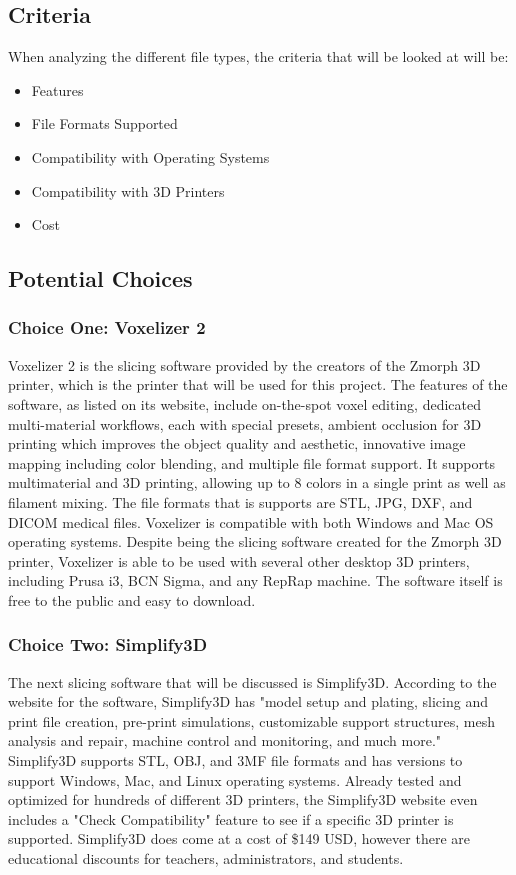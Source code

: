 \documentclass[letterpaper, onecolumn, draftclsnofoot,10pt, compsoc]{IEEEtran}
\begin{document}
\begin{singlespace}
\subsection{Criteria}
When analyzing the different file types, the criteria that will be looked at will be: \begin{itemize}
\item Features
\item File Formats Supported
\item Compatibility with Operating Systems
\item Compatibility with 3D Printers
\item Cost

\end{itemize}
\subsection{Potential Choices}
\subsubsection{Choice One: Voxelizer 2}
Voxelizer 2 is the slicing software provided by the creators of the Zmorph 3D printer, which is the printer that will be used for this project. 
The features of the software, as listed on its website, include on-the-spot voxel editing, dedicated multi-material workflows, each with special presets, ambient occlusion for 3D printing which improves the object quality and aesthetic, innovative image mapping including color blending, and multiple file format support. 
It supports multimaterial and 3D printing, allowing up to 8 colors in a single print as well as filament mixing.
The file formats that is supports are STL, JPG, DXF, and DICOM medical files. 
Voxelizer is compatible with both Windows and Mac OS operating systems. 
Despite being the slicing software created for the Zmorph 3D printer, Voxelizer is able to be used with several other desktop 3D printers, including Prusa i3, BCN Sigma, and any RepRap machine. 
The software itself is free to the public and easy to download. \cite{voxelweb}

\subsubsection{Choice Two: Simplify3D}
The next slicing software that will be discussed is Simplify3D.
According to the website for the software, Simplify3D has "model setup and plating, slicing and print file creation, pre-print simulations, customizable support structures, mesh analysis and repair, machine control and monitoring, and much more."
Simplify3D supports STL, OBJ, and 3MF file formats and has versions to support Windows, Mac, and Linux operating systems.
Already tested and optimized for hundreds of different 3D printers, the Simplify3D website even includes a "Check Compatibility" feature to see if a specific 3D printer is supported.
Simplify3D does come at a cost of \$149 USD, however there are educational discounts for teachers, administrators, and students. \cite{3dsweb}


\end{singlespace}
\end{document}
